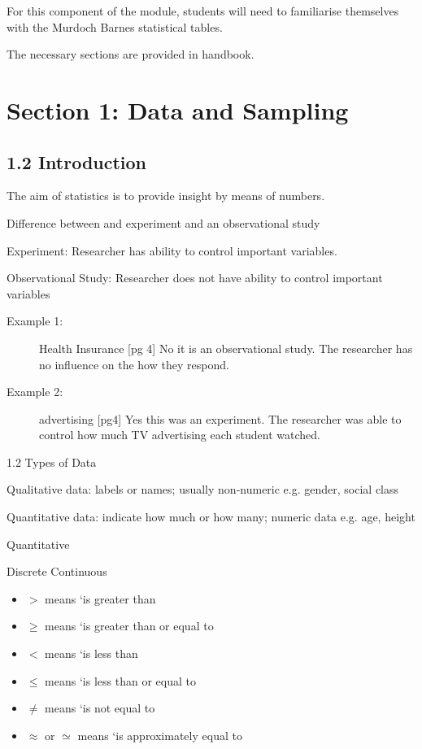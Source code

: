 \documentclass[12pt, a4paper]{report}
\author{ } \date{ }
\theoremstyle{definition}
\theoremstyle{remark}
\begin{document}

For this component of the module, students will need to familiarise themselves with the Murdoch Barnes statistical tables.

The necessary sections are provided in handbook.

\section{Section 1: Data and Sampling}

\subsection{1.2   Introduction}

The aim of statistics is to provide insight by means of numbers.

Difference between and experiment and an observational study

Experiment: Researcher has ability to control important variables.

Observational Study: Researcher does not have ability to control important variables


\begin{description}
\item[Example 1:]  Health Insurance 	[pg 4]
No it is an observational study. The researcher has no influence on the how they respond.

\item[Example 2:]  advertising	  	[pg4]
Yes this was an experiment. The researcher was able to control how much TV advertising each student watched.

\end{description}


1.2   Types of Data

Qualitative data: labels or names; usually non-numeric e.g. gender, social class	 		

Quantitative data: indicate how much or how many; numeric data e.g. age, height

		Quantitative

Discrete				Continuous



\begin{itemize}
	\item $>$  means `is greater than
	\item $\geq$ means `is greater than or equal to
	\item $<$ means `is less than
	\item $\leq$ means `is less than or equal to
	\item $\neq$ means `is not equal to
	\item $\approx$ or $\simeq$ means `is approximately equal to
\end{itemize}
\end{document}
